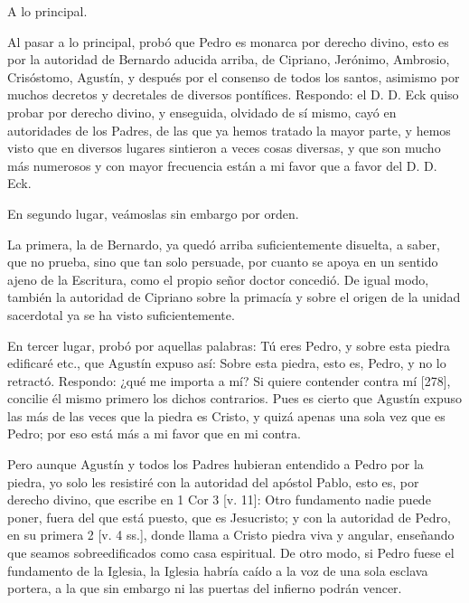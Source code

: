 A lo principal.

Al pasar a lo principal, probó que Pedro es monarca por derecho divino, esto es por la autoridad de Bernardo aducida arriba, de Cipriano, Jerónimo, Ambrosio, Crisóstomo, Agustín, y después por el consenso de todos los santos, asimismo por muchos decretos y decretales de diversos pontífices. Respondo: el D. D. Eck quiso probar por derecho divino, y enseguida, olvidado de sí mismo, cayó en autoridades de los Padres, de las que ya hemos tratado la mayor parte, y hemos visto que en diversos lugares sintieron a veces cosas diversas, y que son mucho más numerosos y con mayor frecuencia están a mi favor que a favor del D. D. Eck.

En segundo lugar, veámoslas sin embargo por orden.

La primera, la de Bernardo, ya quedó arriba suficientemente disuelta, a saber, que no prueba, sino que tan solo persuade, por cuanto se apoya en un sentido ajeno de la Escritura, como el propio señor doctor concedió. De igual modo, también la autoridad de Cipriano sobre la primacía y sobre el origen de la unidad sacerdotal ya se ha visto suficientemente.

En tercer lugar, probó por aquellas palabras: Tú eres Pedro, y sobre esta piedra edificaré etc., que Agustín expuso así: Sobre esta piedra, esto es, Pedro, y no lo retractó. Respondo: ¿qué me importa a mí? Si quiere contender contra mí [278], concilie él mismo primero los dichos contrarios. Pues es cierto que Agustín expuso las más de las veces que la piedra es Cristo, y quizá apenas una sola vez que es Pedro; por eso está más a mi favor que en mi contra.

Pero aunque Agustín y todos los Padres hubieran entendido a Pedro por la piedra, yo solo les resistiré con la autoridad del apóstol Pablo, esto es, por derecho divino, que escribe en 1 Cor 3 [v. 11]: Otro fundamento nadie puede poner, fuera del que está puesto, que es Jesucristo; y con la autoridad de Pedro, en su primera 2 [v. 4 ss.], donde llama a Cristo piedra viva y angular, enseñando que seamos sobreedificados como casa espiritual. De otro modo, si Pedro fuese el fundamento de la Iglesia, la Iglesia habría caído a la voz de una sola esclava portera, a la que sin embargo ni las puertas del infierno podrán vencer.

